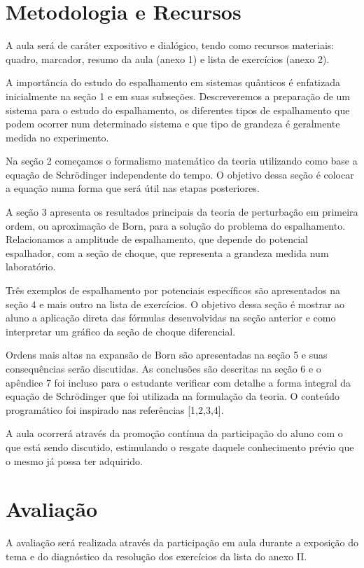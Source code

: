 \documentclass{article}
\begin{document}
\section{Metodologia e Recursos}

A aula será de caráter expositivo e dialógico, tendo como recursos materiais: quadro, marcador, resumo da aula (anexo 1) e lista de exercícios (anexo 2).

A importância do estudo do espalhamento em sistemas quânticos é enfatizada inicialmente na seção 1 e em suas subseções. Descreveremos a preparação de um sistema para o estudo do espalhamento, os diferentes tipos de espalhamento que podem ocorrer num determinado sistema e que tipo de grandeza é geralmente medida no experimento. 

Na seção 2 começamos o formalismo matemático da teoria utilizando como base a equação de Schrödinger independente do tempo. O objetivo dessa seção é colocar a equação numa forma que será útil nas etapas posteriores.

A seção 3 apresenta os resultados principais da teoria de perturbação em primeira ordem, ou aproximação de Born, para a solução do problema do espalhamento. Relacionamos a amplitude de espalhamento, que depende do potencial espalhador, com a seção de choque, que representa a grandeza medida num laboratório.

Três exemplos de espalhamento por potenciais específicos são apresentados na seção 4 e mais outro na lista de exercícios. O objetivo dessa seção é mostrar ao aluno a aplicação direta das fórmulas desenvolvidas na seção anterior e como interpretar um gráfico da seção de choque diferencial.

Ordens mais altas na expansão de Born são apresentadas na seção 5 e suas consequências serão discutidas. As conclusões são descritas na seção 6 e o apêndice 7 foi incluso para o estudante verificar com detalhe a forma integral da equação de Schrödinger que foi utilizada na formulação da teoria. O conteúdo programático foi inspirado nas referências [1,2,3,4].

A aula ocorrerá através da promoção contínua da participação do aluno com o que está sendo discutido, estimulando o resgate daquele conhecimento prévio que o mesmo já possa ter adquirido.

\section{Avaliação}

A avaliação será realizada através da participação em aula durante a exposição do tema e do diagnóstico da resolução dos exercícios da lista do anexo II. 
\end{document}
